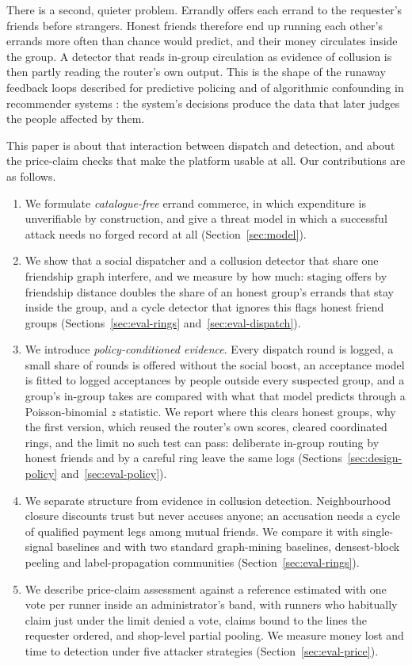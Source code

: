\documentclass[journal]{IEEEtran}
\begin{document}
There is a second, quieter problem. Errandly offers each errand to the requester's
friends before strangers. Honest friends therefore end up running each other's
errands more often than chance would predict, and their money circulates inside
the group. A detector that reads in-group circulation as evidence of collusion is
then partly reading the router's own output. This is the shape of the runaway
feedback loops described for predictive policing \cite{ensign2018runaway} and of
algorithmic confounding in recommender systems \cite{chaney2018algorithmic}: the
system's decisions produce the data that later judges the people affected by them.

This paper is about that interaction between dispatch and detection, and about the
price-claim checks that make the platform usable at all. Our contributions are as
follows.

\begin{enumerate}
\item We formulate \emph{catalogue-free} errand commerce, in which expenditure is
unverifiable by construction, and give a threat model in which a successful attack
needs no forged record at all (Section~\ref{sec:model}).
\item We show that a social dispatcher and a collusion detector that share one
friendship graph interfere, and we measure by how much: staging offers by friendship
distance doubles the share of an honest group's errands that stay inside the group,
and a cycle detector that ignores this flags honest friend groups
(Sections~\ref{sec:eval-rings} and~\ref{sec:eval-dispatch}).
\item We introduce \emph{policy-conditioned evidence}. Every dispatch round is
logged, a small share of rounds is offered without the social boost, an acceptance
model is fitted to logged acceptances by people outside every suspected group, and a
group's in-group takes are compared with what that model predicts through a
Poisson-binomial $z$ statistic. We report where this clears honest groups, why the
first version, which reused the router's own scores, cleared coordinated rings, and
the limit no such test can pass: deliberate in-group routing by honest friends and
by a careful ring leave the same logs (Sections~\ref{sec:design-policy}
and~\ref{sec:eval-policy}).
\item We separate structure from evidence in collusion detection. Neighbourhood
closure discounts trust but never accuses anyone; an accusation needs a cycle of
qualified payment legs among mutual friends. We compare it with single-signal
baselines and with two standard graph-mining baselines, densest-block peeling and
label-propagation communities (Section~\ref{sec:eval-rings}).
\item We describe price-claim assessment against a reference estimated with one vote
per runner inside an administrator's band, with runners who habitually claim just
under the limit denied a vote, claims bound to the lines the requester ordered, and
shop-level partial pooling. We measure money lost and time to detection under five
attacker strategies (Section~\ref{sec:eval-price}).
\end{enumerate}
\end{document}
